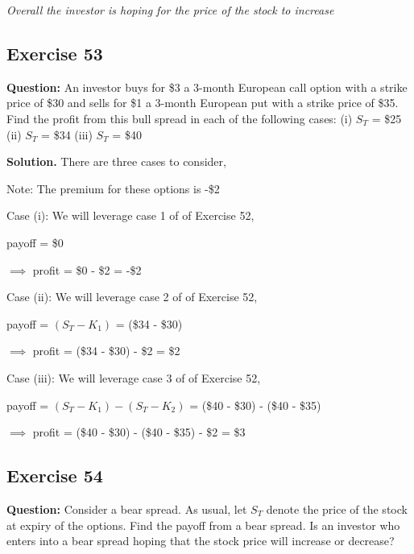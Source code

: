 \documentclass{article}
\begin{document}
\vspace{\baselineskip}

\textit{Overall the investor is hoping for the price of the stock to increase}

\subsection*{Exercise 53}
\textbf{Question:} An investor buys for \$3 a 3-month European call option with a strike price of \$30 and sells for \$1
a 3-month European put with a strike price of \$35. Find the profit from this bull spread in each of the following
cases:
(i) $S_T$ = \$25
(ii) $S_T$ = \$34
(iii) $S_T$ = \$40

\vspace{\baselineskip}

\textbf{Solution.} There are three cases to consider,

Note: The premium for these options is -\$2

\vspace{\baselineskip}

Case (i):
We will leverage case 1 of of Exercise 52,

payoff = \$0

$\implies$ profit = \$0 - \$2 = -\$2

\vspace{\baselineskip}

Case (ii):
We will leverage case 2 of of Exercise 52,

payoff = $(S_T - K_1)$ = (\$34 - \$30)

$\implies$ profit = (\$34 - \$30) -  \$2 = \$2

\vspace{\baselineskip}

Case (iii):
We will leverage case 3 of of Exercise 52,

payoff = $(S_T - K_1) - (S_T - K_2)$ = (\$40 - \$30) - (\$40 - \$35)

$\implies$ profit = (\$40 - \$30) - (\$40 - \$35) - \$2 = \$3


\newpage

\subsection*{Exercise 54}
\textbf{Question:} Consider a bear spread. As usual, let $S_T$ denote the price of the stock
at expiry of the options. Find the payoff from a bear spread. Is an investor who enters into a bear spread hoping
that the stock price will increase or decrease?
\end{document}
